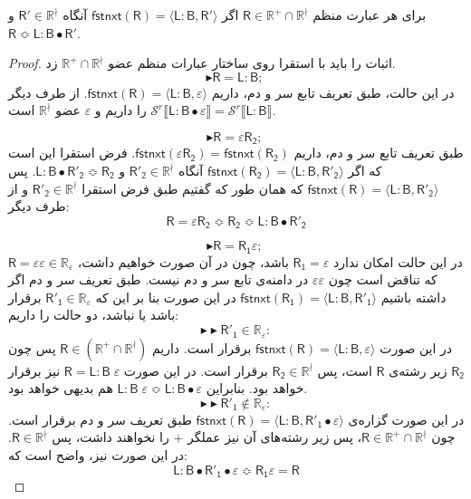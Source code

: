 \begin{thm}
	برای هر عبارت منظم 
	$\mathsf{R} \in \mathbb{R^+ \cap R^\nmid}$
	اگر 
	$\mathsf{fstnxt(R)=\langle L:B , R'\rangle}$
		آنگاه 
	$\mathsf{R'}\in \mathbb{R}^\nmid$
	و 
	$\mathsf{R \Bumpeq L:B\bullet R'}$.
\end{thm}
\begin{proof}
	اثبات را باید با استقرا روی ساختار عبارات منظم عضو 
	$\mathbb{R^+ \cap R^\nmid}$
	زد.
	$$\blacktriangleright\mathsf{R=L:B;\:}$$
	در این حالت، طبق تعریف تابع سر و دم، داریم
	$\mathsf{fstnxt(R)=\langle L:B , \varepsilon \rangle}$.
	از طرف دیگر \break
	$\mathcal{S}^r\llbracket \mathsf{L:B \bullet \varepsilon} \rrbracket = 
	\mathcal{S}^r \llbracket \mathsf{L:B} \rrbracket$
	را داریم و $\varepsilon$ عضو $\mathbb{R^\nmid}$ است.
	
	$$\blacktriangleright\mathsf{R=\varepsilon R_2;\:}$$
	طبق تعریف تابع سر و دم، داریم
	$\mathsf{fstnxt(\varepsilon R_2) = fstnxt(R_2)}$.
		فرض استقرا این است که اگر 
		$\mathsf{fstnxt(R_2)=\langle L:B, R'_2 \rangle}$
	آنگاه 
	$\mathsf{R'_2}\in \mathbb{R^\nmid}$
	و
	$\mathsf{L:B \bullet R'_2} \Bumpeq  \mathsf{R_2}$.
	پس 
	$\mathsf{fstnxt(R)=\langle L:B , R'_2 \rangle}$
	که همان‌ طور که گفتیم طبق فرض استقرا 
	$\mathsf{R'_2} \in \mathbb{R^\nmid}$
	و از طرف دیگر:
	$$\mathsf{R=\varepsilon R_2 \Bumpeq R_2 \Bumpeq L:B \bullet R'_2 }$$
			
	
	
	
	
	
	$$\blacktriangleright\mathsf{R=R_1 \varepsilon;\:}$$
	در این حالت امکان ندارد $\mathsf{R_1=\varepsilon}$ باشد، چون در آن صورت خواهیم داشت، 
	$\mathsf{R=\varepsilon \varepsilon} \in \mathbb{R_\varepsilon}$
	که تناقض است چون $\varepsilon \varepsilon$ در دامنه‌ی تابع سر و دم نیست.
	طبق تعریف سر و دم اگر داشته باشیم 
	$\mathsf {fstnxt(R_1)=\langle L:B , R'_1 \rangle}$
در این صورت بنا بر این که 
$\mathsf{R'_1} \in \mathbb{R_\varepsilon}$
برقرار باشد یا نباشد، دو حالت را داریم:
	$$\blacktriangleright\blacktriangleright \mathsf{R'_1} \in \mathbb{R_\varepsilon}: $$
	در این صورت 
	$\mathsf{fstnxt(R)=\langle L:B , \varepsilon \rangle}$
برقرار است. داریم
 $\mathsf{R} \in \mathbb{( \mathbb{R^+ \cap R^\nmid})}$
  پس 
  چون
  $\mathsf{R_2}$
  زیر رشته‌ی $\mathsf{R}$ است، پس
  $\mathsf{R_2 \in} \mathbb{R^\nmid}$
  برقرار است. در این صورت $\mathsf{R=L:B\;\varepsilon}$ نیز برقرار خواهد بود. بنابراین
  $\mathsf{L:B\;\varepsilon \Bumpeq L:B \bullet \varepsilon}$
  هم بدیهی خواهد بود.
  $$\blacktriangleright\blacktriangleright \mathsf{R'_1} \notin \mathbb{R_\varepsilon}: $$
در این صورت گزاره‌ی 
$\mathsf{fstnxt(R)=\langle L:B , R'_1 \bullet \varepsilon \rangle}$
طبق تعریف سر و دم برقرار است. چون 
$\mathsf{R} \in \mathbb{R^+ \cap R^\nmid}$،
پس زیر رشته‌های آن نیز عملگر $+$ را نخواهند داشت، پس 
$\mathsf{R} \in \mathbb{R^\nmid}$.
در این صورت نیز، واضح است که:
$$\mathsf{L:B \bullet R'_1 \bullet \varepsilon \Bumpeq R_1 \varepsilon = R }$$



\end{proof}
